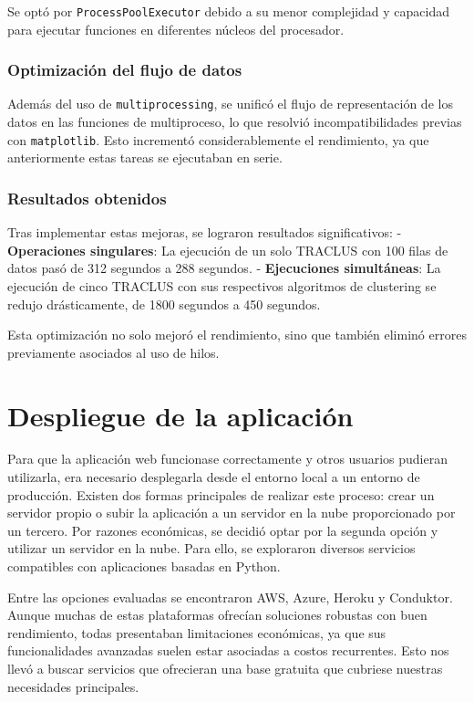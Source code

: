 Se optó por \texttt{ProcessPoolExecutor} debido a su menor complejidad y capacidad para ejecutar funciones en diferentes núcleos del procesador.

\subsubsection{Optimización del flujo de datos}
Además del uso de \texttt{multiprocessing}, se unificó el flujo de representación de los datos en las funciones de multiproceso, lo que resolvió incompatibilidades previas con \texttt{matplotlib}. Esto incrementó considerablemente el rendimiento, ya que anteriormente estas tareas se ejecutaban en serie.

\subsubsection{Resultados obtenidos}
Tras implementar estas mejoras, se lograron resultados significativos:
- \textbf{Operaciones singulares}: La ejecución de un solo TRACLUS con 100 filas de datos pasó de 312 segundos a 288 segundos.
- \textbf{Ejecuciones simultáneas}: La ejecución de cinco TRACLUS con sus respectivos algoritmos de clustering se redujo drásticamente, de 1800 segundos a 450 segundos.

Esta optimización no solo mejoró el rendimiento, sino que también eliminó errores previamente asociados al uso de hilos.


\section{Despliegue de la aplicación}

Para que la aplicación web funcionase correctamente y otros usuarios pudieran utilizarla, era necesario desplegarla desde el entorno local a un entorno de producción. Existen dos formas principales de realizar este proceso: crear un servidor propio o subir la aplicación a un servidor en la nube proporcionado por un tercero. Por razones económicas, se decidió optar por la segunda opción y utilizar un servidor en la nube. Para ello, se exploraron diversos servicios compatibles con aplicaciones basadas en Python.

Entre las opciones evaluadas se encontraron AWS, Azure, Heroku y Conduktor. Aunque muchas de estas plataformas ofrecían soluciones robustas con buen rendimiento, todas presentaban limitaciones económicas, ya que sus funcionalidades avanzadas suelen estar asociadas a costos recurrentes. Esto nos llevó a buscar servicios que ofrecieran una base gratuita que cubriese nuestras necesidades principales.

